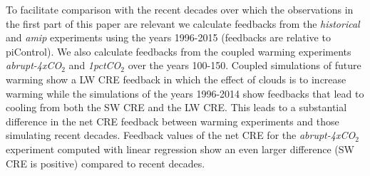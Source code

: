 \documentclass[draft]{agujournal2019}
\begin{document}
To facilitate comparison with the recent decades over which the observations in the first part of this paper are relevant 
we calculate feedbacks from the \textit{historical} and \textit{amip} experiments using the years 1996-2015 
(feedbacks are relative to piControl).  We also calculate feedbacks from the coupled warming experiments 
\textit{abrupt-4xCO$_2$} and \textit{1pctCO$_2$} over the years 100-150.
Coupled simulations of future warming show a LW CRE feedback in which the effect of clouds is to increase warming while 
the simulations of the years 1996-2014 show feedbacks that lead to cooling from both the SW CRE and the 
LW CRE.   This leads to a substantial difference in the net CRE feedback between warming experiments and those simulating recent 
decades.  Feedback values of the net CRE for the \textit{abrupt-4xCO$_2$} experiment computed with linear regression show an even 
larger difference (SW CRE is positive) compared to recent decades.  
\end{document}
